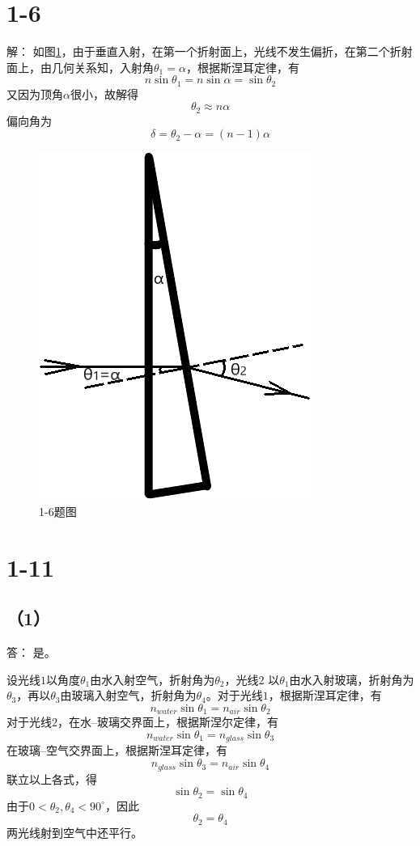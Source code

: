 \documentclass[10pt,a4paper]{article}
\theoremstyle{remark}
\begin{document}
\section*{1-6}解：
如图\ref{FigureofProblem1-6}，由于垂直入射，在第一个折射面上，光线不发生偏折，在第二个折射面上，由几何关系知，入射角$\theta_1 = \alpha$，根据斯涅耳定律，有
\[
n\sin\theta_1 = n\sin\alpha = \sin\theta_2
\]
又因为顶角$\alpha$很小，故解得
\[
\theta_2\approx n\alpha
\]
偏向角为
\[
\delta = \theta_2 - \alpha = (n - 1)\alpha
\]
\begin{figure}[h]
\centering
\includegraphics[scale = .6]{FigureofProblem1-6.png}
\caption{1-6题图}\label{FigureofProblem1-6}
\end{figure}
\section*{1-11}
\subsection*{（1）}答：
是。

设光线$1$以角度$\theta_1$由水入射空气，折射角为$\theta_2$，光线$2$ 以$\theta_1$由水入射玻璃，折射角为$\theta_3$，再以$\theta_3$由玻璃入射空气，折射角为$\theta_4$。对于光线$1$，根据斯涅耳定律，有
\[
n_{water}\sin\theta_1 = n_{air}\sin\theta_2
\]
对于光线$2$，在水--玻璃交界面上，根据斯涅尔定律，有
\[
n_{water}\sin\theta_1 = n_{glass}\sin\theta_3
\]
在玻璃--空气交界面上，根据斯涅耳定律，有
\[
n_{glass}\sin\theta_3 = n_{air}\sin\theta_4
\]
联立以上各式，得
\[
\sin\theta_2 = \sin\theta_4
\]
由于$0 < \theta_2,\theta_4 < 90^{\circ}$，因此
\[
\theta_2 = \theta_4
\]
两光线射到空气中还平行。
\end{document}
